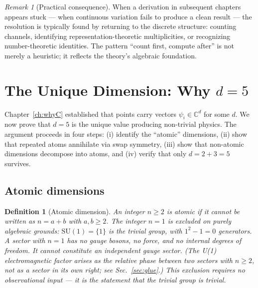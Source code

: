 \documentclass[12pt]{article}
\newtheorem{definition}[theorem]{Definition}
\theoremstyle{remark}
\newtheorem{remark}[theorem]{Remark}
\theoremstyle{definition}
\newcommand{\CC}{\mathbb{C}}
\begin{document}
\begin{remark}[Practical consequence]
When a derivation in subsequent chapters appears stuck --- when continuous variation fails to produce a clean result --- the resolution is typically found by returning to the discrete structure: counting channels, identifying representation-theoretic multiplicities, or recognizing number-theoretic identities. The pattern ``count first, compute after'' is not merely a heuristic; it reflects the theory's algebraic foundation.
\end{remark}



\section{The Unique Dimension: Why $d = 5$}
\label{ch:whyd5}

Chapter~\ref{ch:whyC} established that points carry vectors $\psi_i \in \CC^d$ for some $d$. We now prove that $d = 5$ is the unique value producing non-trivial physics. The argument proceeds in four steps: (i) identify the ``atomic'' dimensions, (ii) show that repeated atoms annihilate via swap symmetry, (iii) show that non-atomic dimensions decompose into atoms, and (iv) verify that only $d = 2 + 3 = 5$ survives.

\subsection{Atomic dimensions}

\begin{definition}[Atomic dimension]
An integer $n \geq 2$ is \emph{atomic} if it cannot be written as $n = a + b$ with $a, b \geq 2$. The integer $n = 1$ is excluded on purely algebraic grounds: $\text{SU}(1) = \{1\}$ is the trivial group, with $1^2 - 1 = 0$ generators. A sector with $n = 1$ has no gauge bosons, no force, and no internal degrees of freedom. It cannot constitute an independent gauge sector. (The U(1) electromagnetic factor arises as the \emph{relative phase between two sectors with $n \geq 2$}, not as a sector in its own right; see Sec.~\ref{sec:glue}.) This exclusion requires no observational input --- it is the statement that the trivial group is trivial.
\end{definition}
\end{document}
